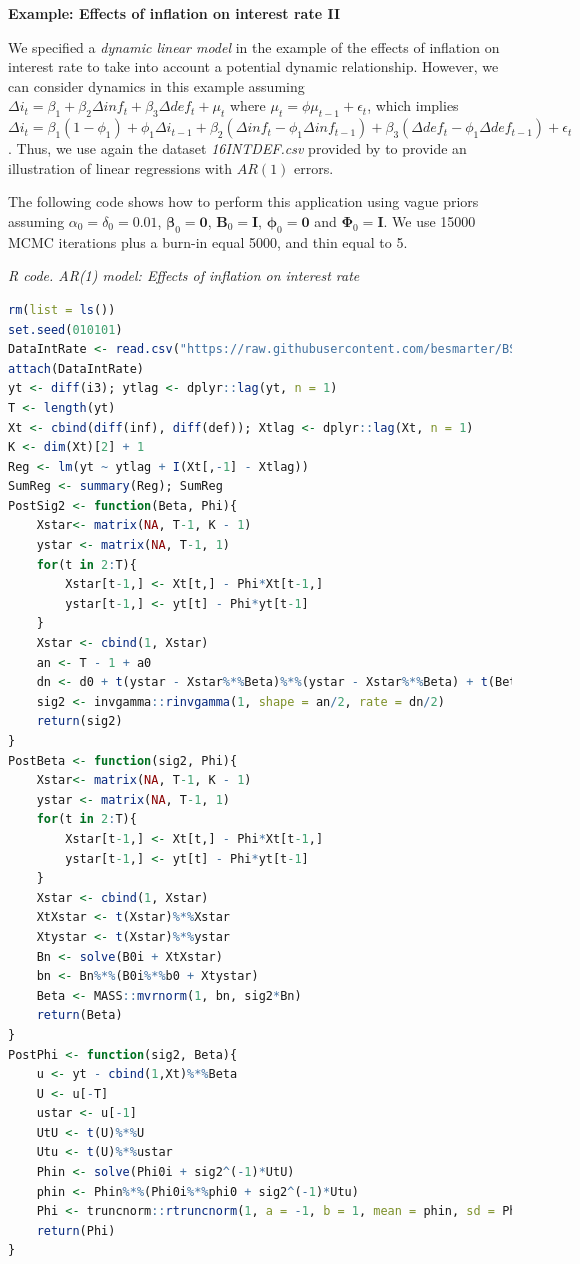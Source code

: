\textbf{Example: Effects of inflation on interest rate II}

We specified a \textit{dynamic linear model} in the example of the effects of inflation on interest rate to take into account a potential dynamic relationship. However, we can consider dynamics in this example assuming  $\Delta i_t=\beta_{1}+\beta_{2}\Delta inf_t+\beta_{3}\Delta def_t+\mu_t$ where $\mu_t=\phi \mu_{t-1} + \epsilon_t$, which implies $\Delta i_t=\beta_{1}(1-\phi_1)+\phi_1\Delta i_{t-1}+\beta_{2}(\Delta inf_t-\phi_1 \Delta inf_{t-1})+\beta_{3}(\Delta def_t-\phi_1 \Delta def_{t-1})+\epsilon_t$. Thus, we use again the dataset \textit{16INTDEF.csv} provided by \cite[Chaps.~10]{wooldridge2016introductory} to provide an illustration of linear regressions with $AR(1)$ errors.

The following code shows how to perform this application using vague priors assuming $\alpha_0=\delta_0=0.01$, $\bm{\beta}_0=\bm{0}$, $\bm{B}_0=\bm{I}$, $\bm{\phi}_0=\bm{0}$ and $\bm{\Phi}_0=\bm{I}$. We use 15000 MCMC iterations plus a burn-in equal 5000, and thin equal to 5. 


\begin{tcolorbox}[enhanced,width=4.67in,center upper,
	fontupper=\large\bfseries,drop shadow southwest,sharp corners]
	\textit{R code. AR(1) model: Effects of inflation on interest rate}
	\begin{VF}
		\begin{lstlisting}[language=R]
rm(list = ls())
set.seed(010101)
DataIntRate <- read.csv("https://raw.githubusercontent.com/besmarter/BSTApp/refs/heads/master/DataApp/16INTDEF.csv", sep = ",", header = TRUE, quote = "")
attach(DataIntRate)
yt <- diff(i3); ytlag <- dplyr::lag(yt, n = 1)
T <- length(yt)
Xt <- cbind(diff(inf), diff(def)); Xtlag <- dplyr::lag(Xt, n = 1)
K <- dim(Xt)[2] + 1
Reg <- lm(yt ~ ytlag + I(Xt[,-1] - Xtlag))
SumReg <- summary(Reg); SumReg
PostSig2 <- function(Beta, Phi){
	Xstar<- matrix(NA, T-1, K - 1)
	ystar <- matrix(NA, T-1, 1)
	for(t in 2:T){
		Xstar[t-1,] <- Xt[t,] - Phi*Xt[t-1,]
		ystar[t-1,] <- yt[t] - Phi*yt[t-1]
	}
	Xstar <- cbind(1, Xstar)
	an <- T - 1 + a0
	dn <- d0 + t(ystar - Xstar%*%Beta)%*%(ystar - Xstar%*%Beta) + t(Beta - b0)%*%B0i%*%(Beta - b0)
	sig2 <- invgamma::rinvgamma(1, shape = an/2, rate = dn/2)
	return(sig2)
}
PostBeta <- function(sig2, Phi){
	Xstar<- matrix(NA, T-1, K - 1)
	ystar <- matrix(NA, T-1, 1)
	for(t in 2:T){
		Xstar[t-1,] <- Xt[t,] - Phi*Xt[t-1,]
		ystar[t-1,] <- yt[t] - Phi*yt[t-1]
	}
	Xstar <- cbind(1, Xstar)
	XtXstar <- t(Xstar)%*%Xstar
	Xtystar <- t(Xstar)%*%ystar
	Bn <- solve(B0i + XtXstar)
	bn <- Bn%*%(B0i%*%b0 + Xtystar)
	Beta <- MASS::mvrnorm(1, bn, sig2*Bn)
	return(Beta)
}
PostPhi <- function(sig2, Beta){
	u <- yt - cbind(1,Xt)%*%Beta
	U <- u[-T]
	ustar <- u[-1]
	UtU <- t(U)%*%U
	Utu <- t(U)%*%ustar
	Phin <- solve(Phi0i + sig2^(-1)*UtU)
	phin <- Phin%*%(Phi0i%*%phi0 + sig2^(-1)*Utu)
	Phi <- truncnorm::rtruncnorm(1, a = -1, b = 1, mean = phin, sd = Phin^0.5)
	return(Phi)
}
		\end{lstlisting}
	\end{VF}
\end{tcolorbox}


